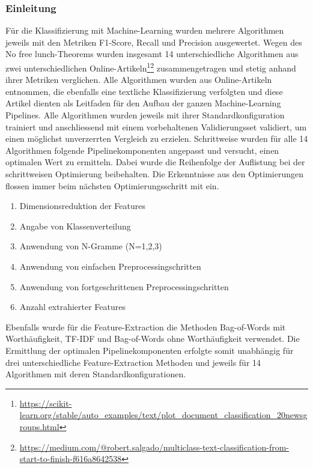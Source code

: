 \subsubsection{Einleitung}
Für die Klassifizierung mit Machine-Learning wurden mehrere Algorithmen jeweils mit den Metriken F1-Score, Recall und Precision ausgewertet.
Wegen des \glqq No free lunch\grqq{}-Theorems wurden insgesamt 14 unterschiedliche Algorithmen aus zwei unterschiedlichen Online-Artikeln\footnote{\url{https://scikit-learn.org/stable/auto_examples/text/plot_document_classification_20newsgroups.html}}\footnote{\url{https://medium.com/@robert.salgado/multiclass-text-classification-from-start-to-finish-f616a8642538}} zusammengetragen und stetig anhand ihrer Metriken verglichen.
Alle Algorithmen wurden aus Online-Artikeln entnommen, die ebenfalls eine textliche Klassifizierung verfolgten und diese Artikel dienten als Leitfaden für den Aufbau der ganzen Machine-Learning Pipelines.
Alle Algorithmen wurden jeweils mit ihrer Standardkonfiguration trainiert und anschliessend mit einem vorbehaltenen Validierungsset validiert, um einen möglichst unverzerrten Vergleich zu erzielen.
Schrittweise wurden für alle 14 Algorithmen folgende Pipelinekomponenten angepasst und versucht, einen optimalen Wert zu ermitteln.
Dabei wurde die Reihenfolge der Auflistung bei der schrittweisen Optimierung beibehalten.
Die Erkenntnisse aus den Optimierungen flossen immer beim nächsten Optimierungsschritt mit ein.
\begin{enumerate}
	\item Dimensionsreduktion der Features 
	\item Angabe von Klassenverteilung
	\item Anwendung von N-Gramme (N={1,2,3})
	\item Anwendung von einfachen Preprocessingschritten
	\item Anwendung von fortgeschrittenen Preprocessingschritten
	\item Anzahl extrahierter Features
\end{enumerate}
Ebenfalls wurde für die Feature-Extraction die Methoden Bag-of-Words mit Worthäufigkeit, TF-IDF und Bag-of-Words ohne Worthäufigkeit verwendet.
Die Ermittlung der optimalen Pipelinekomponenten erfolgte somit unabhängig für drei unterschiedliche Feature-Extraction Methoden und jeweils für 14 Algorithmen mit deren Standardkonfigurationen.
